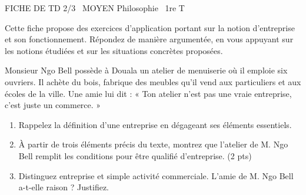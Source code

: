 \documentclass[11pt]{article}
\begin{document}
\begin{tcolorbox}[enhanced,colback=popink,colframe=popink,arc=10pt,boxrule=0pt,left=12pt,right=12pt,top=9pt,bottom=9pt]
{\color{white}\popxbold\small FICHE DE TD 2/3 \textbullet\ MOYEN \hfill Philosophie \textbullet\ 1re T\par}
\end{tcolorbox}
\vspace{4pt}
Cette fiche propose des exercices d'application portant sur la notion d'entreprise et son fonctionnement. Répondez de manière argumentée, en vous appuyant sur les notions étudiées et sur les situations concrètes proposées.

\begin{exercice}
Monsieur Ngo Bell possède à Douala un atelier de menuiserie où il emploie six ouvriers. Il achète du bois, fabrique des meubles qu'il vend aux particuliers et aux écoles de la ville. Une amie lui dit : « Ton atelier n'est pas une vraie entreprise, c'est juste un commerce. »
\begin{enumerate}
\item Rappelez la définition d'une entreprise en dégageant ses éléments essentiels.
\item À partir de trois éléments précis du texte, montrez que l'atelier de M. Ngo Bell remplit les conditions pour être qualifié d'entreprise. (2 pts)
\item Distinguez entreprise et simple activité commerciale. L'amie de M. Ngo Bell a-t-elle raison ? Justifiez.
\end{enumerate}
\end{exercice}
\end{document}
